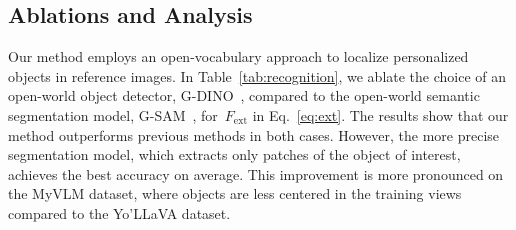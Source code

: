 \subsection{Ablations and Analysis}
\vspace{-0.1cm}
Our method employs an open-vocabulary approach to localize personalized objects in reference images. In Table~\ref{tab:recognition}, we ablate the choice of an open-world object detector, G-DINO~\cite{liu2023grounding}, compared to the open-world semantic segmentation model, G-SAM~\cite{ren2024grounded}, for~$F_\text{ext}$ in Eq.~\ref{eq:ext}. The results show that our method outperforms previous methods in both cases. However, the more precise segmentation model, which extracts only patches of the object of interest, achieves the best accuracy on average. This improvement is more pronounced on the MyVLM dataset, where objects are less centered in the training views compared to the Yo’LLaVA dataset.


